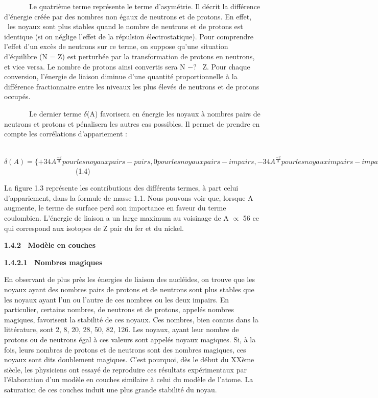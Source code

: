 \documentclass[a4paper]{article}
\begin{document}
\ \ \ \ \ \ \ Le quatrième terme représente le terme d’asymétrie. Il décrit la différence d’énergie créée par des
nombres non égaux de neutrons et de protons. En effet, \textcolor[rgb]{0.1254902,0.12941177,0.13333334}{~les noyaux
sont plus stables quand le nombre de neutrons et de protons est identique (si on néglige l'effet de la répulsion
électrostatique).} \textcolor[rgb]{0.1254902,0.12941177,0.13333334}{Pour comprendre l'effet d'un excès de neutrons sur
ce terme, on suppose qu’une situation d'équilibre (N = Z) est perturbée par la transformation de protons en neutrons,
et vice versa. Le nombre de protons ainsi convertis sera N } $-?$ \textcolor[rgb]{0.1254902,0.12941177,0.13333334}{\ Z.
Pour chaque conversion, l'énergie de liaison diminue d'une quantité proportionnelle à la différence fractionnaire entre
les niveaux les plus élevés de neutrons et de protons occupés.}

\ \ \ \ \ \ \ Le dernier terme $\delta $(A) favorisera en énergie les noyaux à nombres pairs de neutrons et protons et
pénalisera les autres cas possibles. Il permet de prendre en compte les corrélations d’appariement :

\ \ \ \ \ \ \ \ \ \ \ \ \ \  $\delta \left(A\right)=\{+34A^{\frac{-2}
3}\mathit{pour}\mathit{les}\mathit{noyaux}\mathit{pairs}-\mathit{pairs},0\mathit{pour}\mathit{les}\mathit{noyaux}\mathit{pairs}-\mathit{impairs},-34A^{\frac{-2}
3}\mathit{pour}\mathit{les}\mathit{noyaux}\mathit{impairs}-\mathit{impairs.}$\ \ \ \ \ \ \ \ \ \ \ \ \ \ \ \ \ \ \ \ (1.4)


\bigskip

La figure 1.3 représente les contributions des différents termes, à part celui d’appariement, dans la formule de masse
1.1. Nous pouvons voir que, lorsque A augmente, le terme de surface perd son importance en faveur du terme coulombien.
L’énergie de liaison a un large maximum au voisinage de A ${\propto}$ 56 ce qui correspond aux isotopes de Z pair du
fer et du nickel.

\textbf{1.4.2 \ Modèle en couches}

\textbf{1.4.2.1 \ Nombres magiques}

En observant de plus près les énergies de liaison des nucléides, on trouve que les noyaux ayant des nombres pairs de
protons et de neutrons sont plus stables que les noyaux ayant l’un ou l’autre de ces nombres ou les deux impairs. En
particulier, certains nombres, de neutrons et de protons, appelés {\textquotedbl}nombres magiques{\textquotedbl},
favorisent la stabilité de ces noyaux. Ces nombres, bien connus dans la littérature, sont 2, 8, 20, 28, 50, 82, 126.
Les noyaux, ayant leur nombre de protons ou de neutrons égal à ces valeurs sont appelés {\textquotedbl}noyaux
magiques{\textquotedbl}. Si, à la fois, leurs nombres de protons et de neutrons sont des nombres magiques, ces noyaux
sont dits {\textquotedbl}doublement magiques{\textquotedbl}. C’est pourquoi, dès le début du XXème siècle, les
physiciens ont essayé de reproduire ces résultats expérimentaux par l’élaboration d’un modèle en couches similaire à
celui du modèle de l’atome. La saturation de ces couches induit une plus grande stabilité du noyau.
\end{document}
